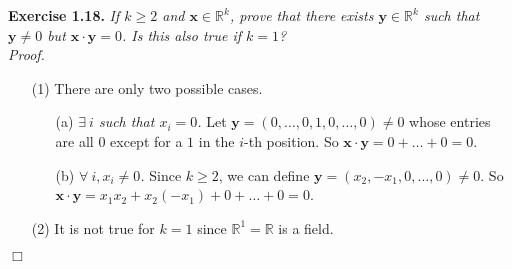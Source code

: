 \documentclass{article}
\begin{document}



\textbf{Exercise 1.18.}
\emph{If $k \geq 2$ and $\mathbf{x} \in \mathbb{R}^k$,
prove that there exists $\mathbf{y} \in \mathbb{R}^k$ such that
$\mathbf{y} \neq 0$ but $\mathbf{x} \cdot \mathbf{y} = 0$.
Is this also true if $k = 1$?} \\

\emph{Proof.}
\begin{enumerate}
\item[(1)]
There are only two possible cases.
  \begin{enumerate}
  \item[(a)]
  \emph{$\exists \: i$ such that $x_i = 0$.}
  Let $\mathbf{y} = (0, \ldots, 0, 1, 0, \ldots, 0) \neq 0$
  whose entries are all $0$ except for a $1$ in the $i$-th position.
  So $\mathbf{x} \cdot \mathbf{y} = 0 + \ldots + 0 = 0$.
  \item[(b)]
  \emph{$\forall \: i, x_i \neq 0$.}
  Since $k \geq 2$, we can define
  $\mathbf{y} = (x_2, -x_1, 0, \ldots, 0) \neq 0.$
  So $\mathbf{x} \cdot \mathbf{y} = x_1 x_2 + x_2 (-x_1) + 0 + \ldots + 0 = 0$.
  \end{enumerate}
\item[(2)]
It is not true for $k = 1$ since $\mathbb{R}^1 = \mathbb{R}$ is a field. \\
\end{enumerate}
$\Box$ \\\\



\end{document}
